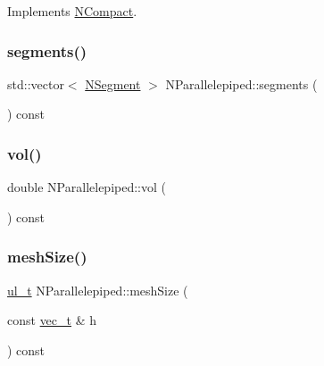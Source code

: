 Implements \mbox{\hyperlink{class_n_compact_ad4cdc60c75ca433c63f44ec13063e2fe}{N\+Compact}}.

\mbox{\label{class_n_parallelepiped_a3440b48cfd7491ed747690a9f69dbbe4}} 
\subsubsection{\texorpdfstring{segments()}{segments()}}
{\footnotesize\ttfamily std\+::vector$<$ \mbox{\hyperlink{class_n_segment}{N\+Segment}} $>$ N\+Parallelepiped\+::segments (\begin{DoxyParamCaption}{ }\end{DoxyParamCaption}) const}

\mbox{\label{class_n_parallelepiped_a8529874bae044bdee3e0d805dae1887d}} 
\subsubsection{\texorpdfstring{vol()}{vol()}}
{\footnotesize\ttfamily double N\+Parallelepiped\+::vol (\begin{DoxyParamCaption}{ }\end{DoxyParamCaption}) const}

\mbox{\label{class_n_parallelepiped_a99696422faefb6e2f558c794017c95e4}} 
\subsubsection{\texorpdfstring{meshSize()}{meshSize()}}
{\footnotesize\ttfamily \mbox{\hyperlink{typedef_8h_a1b140a2034db3f5dfe18a987745df43a}{ul\+\_\+t}} N\+Parallelepiped\+::mesh\+Size (\begin{DoxyParamCaption}\item[{const \mbox{\hyperlink{group___n_algebra_ga0a2cfc67e738a3d73e4f12098c4c07f6}{vec\+\_\+t}} \&}]{h }\end{DoxyParamCaption}) const\hspace{0.3cm}{\ttfamily [protected]}}



